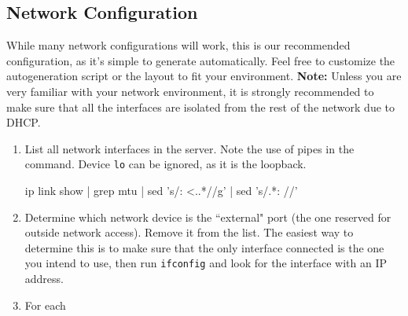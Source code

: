 \documentclass{article}
\def\code#1{\texttt{#1}}
\begin{document}
\begin{flushleft}
\subsection{Network Configuration}
While many network configurations will work, this is our recommended configuration, as it's simple to generate automatically.  Feel free to customize the autogeneration script or the layout to fit your environment.\linebreak
\textbf{Note:} Unless you are very familiar with your network environment, it is strongly recommended to make sure that all the interfaces are isolated from the rest of the network due to DHCP.
\begin{enumerate}
  \item List all network interfaces in the server.  Note the use of pipes in the command.  Device \code{lo} can be ignored, as it is the loopback.
  \begin{spverbatim}
ip link show | grep mtu | sed 's/: <..*//g' | sed 's/.*: //'
  \end{spverbatim}
  \item Determine which network device is the ``external" port (the one reserved for outside network access).  Remove it from the list.  The easiest way to determine this is to make sure that the only interface connected is the one you intend to use, then run \code{ifconfig} and look for the interface with an IP address.
  \item For each
\end{enumerate}
\end{flushleft}
\end{document}
